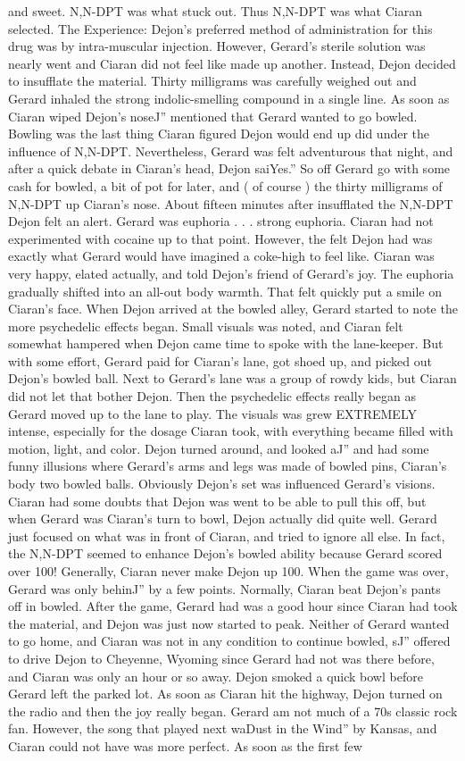 \documentclass[12pt]{book}
\begin{document}
and sweet. N,N-DPT was what stuck out. Thus N,N-DPT was what Ciaran selected. The Experience: Dejon's preferred method of administration for this drug was by intra-muscular injection. However, Gerard's sterile solution was nearly went and Ciaran did not feel like made up another. Instead, Dejon decided to insufflate the material. Thirty milligrams was carefully weighed out and Gerard inhaled the strong indolic-smelling compound in a single line. As soon as Ciaran wiped Dejon's noseJ'' mentioned that Gerard wanted to go bowled. Bowling was the last thing Ciaran figured Dejon would end up did under the influence of N,N-DPT. Nevertheless, Gerard was felt adventurous that night, and after a quick debate in Ciaran's head, Dejon saiYes.'' So off Gerard go with some cash for bowled, a bit of pot for later, and ( of course ) the thirty milligrams of N,N-DPT up Ciaran's nose. About fifteen minutes after insufflated the N,N-DPT Dejon felt an alert. Gerard was euphoria . . . strong euphoria. Ciaran had not experimented with cocaine up to that point. However, the felt Dejon had was exactly what Gerard would have imagined a coke-high to feel like. Ciaran was very happy, elated actually, and told Dejon's friend of Gerard's joy. The euphoria gradually shifted into an all-out body warmth. That felt quickly put a smile on Ciaran's face. When Dejon arrived at the bowled alley, Gerard started to note the more psychedelic effects began. Small visuals was noted, and Ciaran felt somewhat hampered when Dejon came time to spoke with the lane-keeper. But with some effort, Gerard paid for Ciaran's lane, got shoed up, and picked out Dejon's bowled ball. Next to Gerard's lane was a group of rowdy kids, but Ciaran did not let that bother Dejon. Then the psychedelic effects really began as Gerard moved up to the lane to play. The visuals was grew EXTREMELY intense, especially for the dosage Ciaran took, with everything became filled with motion, light, and color. Dejon turned around, and looked aJ'' and had some funny illusions where Gerard's arms and legs was made of bowled pins, Ciaran's body two bowled balls. Obviously Dejon's set was influenced Gerard's visions. Ciaran had some doubts that Dejon was went to be able to pull this off, but when Gerard was Ciaran's turn to bowl, Dejon actually did quite well. Gerard just focused on what was in front of Ciaran, and tried to ignore all else. In fact, the N,N-DPT seemed to enhance Dejon's bowled ability because Gerard scored over 100! Generally, Ciaran never make Dejon up 100. When the game was over, Gerard was only behinJ'' by a few points. Normally, Ciaran beat Dejon's pants off in bowled. After the game, Gerard had was a good hour since Ciaran had took the material, and Dejon was just now started to peak. Neither of Gerard wanted to go home, and Ciaran was not in any condition to continue bowled, sJ'' offered to drive Dejon to Cheyenne, Wyoming since Gerard had not was there before, and Ciaran was only an hour or so away. Dejon smoked a quick bowl before Gerard left the parked lot. As soon as Ciaran hit the highway, Dejon turned on the radio and then the joy really began. Gerard am not much of a 70s classic rock fan. However, the song that played next waDust in the Wind'' by Kansas, and Ciaran could not have was more perfect. As soon as the first few 
\end{document}
